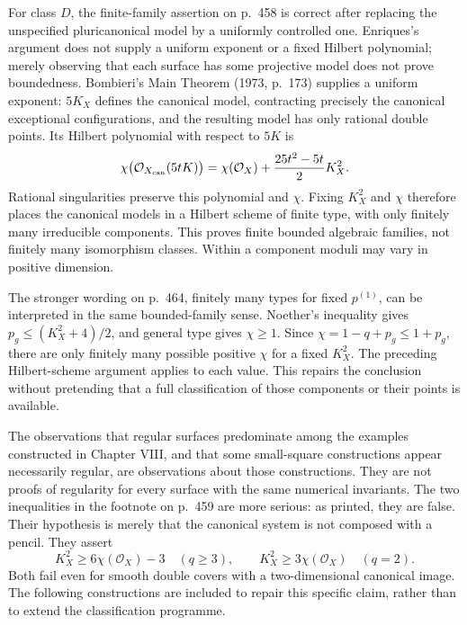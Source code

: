 For class \(D\), the finite-family assertion on p.~458 is correct after replacing the unspecified pluricanonical model by a uniformly controlled one. Enriques's argument does not supply a uniform exponent or a fixed Hilbert polynomial; merely observing that each surface has some projective model does not prove boundedness. Bombieri's Main Theorem (1973, p.~173) supplies a uniform exponent: \(5K_X\) defines the canonical model, contracting precisely the canonical exceptional configurations, and the resulting model has only rational double points. Its Hilbert polynomial with respect to \(5K\) is
\[
\chi\bigl(\mathcal O_{X_{\rm can}}(5tK)\bigr)
=\chi(\mathcal O_X)+\frac{25t^2-5t}{2}K_X^2.
\]
Rational singularities preserve this polynomial and \(\chi\). Fixing \(K_X^2\) and \(\chi\) therefore places the canonical models in a Hilbert scheme of finite type, with only finitely many irreducible components. This proves finite bounded algebraic families, not finitely many isomorphism classes. Within a component moduli may vary in positive dimension.

The stronger wording on p.~464, finitely many types for fixed \(p^{(1)}\), can be interpreted in the same bounded-family sense. Noether's inequality gives \(p_g\le(K_X^2+4)/2\), and general type gives \(\chi\ge1\). Since \(\chi=1-q+p_g\le1+p_g\), there are only finitely many possible positive \(\chi\) for a fixed \(K_X^2\). The preceding Hilbert-scheme argument applies to each value. This repairs the conclusion without pretending that a full classification of those components or their points is available.

The observations that regular surfaces predominate among the examples constructed in Chapter VIII, and that some small-square constructions appear necessarily regular, are observations about those constructions. They are not proofs of regularity for every surface with the same numerical invariants. The two inequalities in the footnote on p.~459 are more serious: as printed, they are false. Their hypothesis is merely that the canonical system is not composed with a pencil. They assert
\[
K_X^2\ge6\chi(\mathcal O_X)-3\quad(q\ge3),
\qquad
K_X^2\ge3\chi(\mathcal O_X)\quad(q=2).
\]
Both fail even for smooth double covers with a two-dimensional canonical image. The following constructions are included to repair this specific claim, rather than to extend the classification programme.

